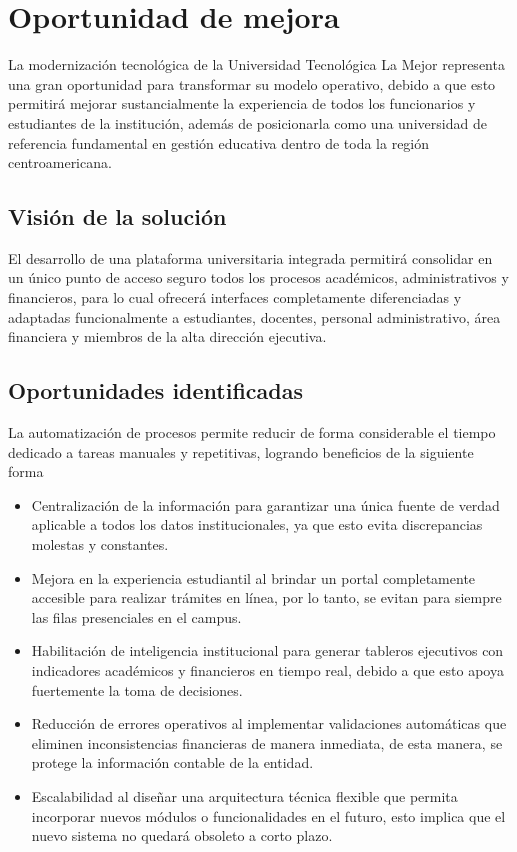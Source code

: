 \documentclass[11pt,spanish]{article}
\begin{document}
\section{Oportunidad de mejora}

La modernización tecnológica de la Universidad Tecnológica La Mejor representa una gran oportunidad para transformar su modelo operativo, debido a que esto permitirá mejorar sustancialmente la experiencia de todos los funcionarios y estudiantes de la institución, además de posicionarla como una universidad de referencia fundamental en gestión educativa dentro de toda la región centroamericana.

\subsection{Visión de la solución}

El desarrollo de una plataforma universitaria integrada permitirá consolidar en un único punto de acceso seguro todos los procesos académicos, administrativos y financieros, para lo cual ofrecerá interfaces completamente diferenciadas y adaptadas funcionalmente a estudiantes, docentes, personal administrativo, área financiera y miembros de la alta dirección ejecutiva.

\subsection{Oportunidades identificadas}

La automatización de procesos permite reducir de forma considerable el tiempo dedicado a tareas manuales y repetitivas, logrando beneficios de la siguiente forma

\begin{itemize}
    \item Centralización de la información para garantizar una única fuente de verdad aplicable a todos los datos institucionales, ya que esto evita discrepancias molestas y constantes.
    \item Mejora en la experiencia estudiantil al brindar un portal completamente accesible para realizar trámites en línea, por lo tanto, se evitan para siempre las filas presenciales en el campus.
    \item Habilitación de inteligencia institucional para generar tableros ejecutivos con indicadores académicos y financieros en tiempo real, debido a que esto apoya fuertemente la toma de decisiones.
    \item Reducción de errores operativos al implementar validaciones automáticas que eliminen inconsistencias financieras de manera inmediata, de esta manera, se protege la información contable de la entidad.
    \item Escalabilidad al diseñar una arquitectura técnica flexible que permita incorporar nuevos módulos o funcionalidades en el futuro, esto implica que el nuevo sistema no quedará obsoleto a corto plazo.
\end{itemize}
\end{document}
